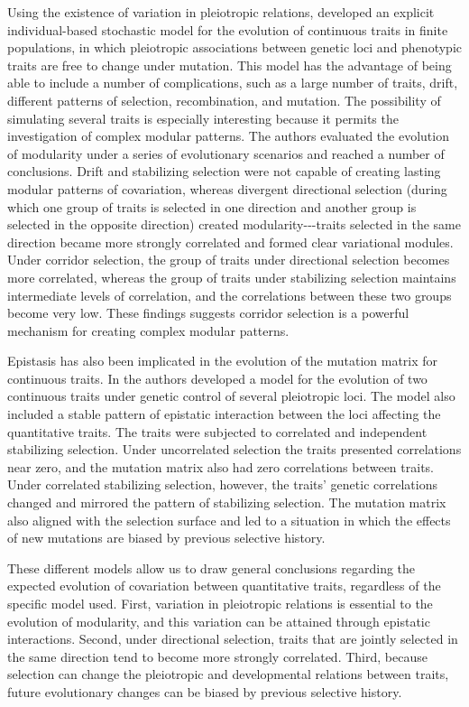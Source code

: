 \begin{refsection}
Using the existence of variation in pleiotropic relations,
\textcite{Melo2015-bk} developed an
explicit individual-based stochastic model for the evolution of
continuous traits in finite populations, in which pleiotropic
associations between genetic loci and phenotypic traits are free to
change under mutation. This model has the advantage of being able to
include a number of complications, such as a large number of traits,
drift, different patterns of selection, recombination, and mutation. The
possibility of simulating several traits is especially interesting
because it permits the investigation of complex modular patterns. The
authors evaluated the evolution of modularity under a series of
evolutionary scenarios and reached a number of conclusions. Drift and
stabilizing selection were not capable of creating lasting modular
patterns of covariation, whereas divergent directional selection (during
which one group of traits is selected in one direction and another group
is selected in the opposite direction) created modularity-\/-\/-traits
selected in the same direction became more strongly correlated and
formed clear variational modules. Under corridor selection, the group of
traits under directional selection becomes more correlated, whereas the
group of traits under stabilizing selection maintains intermediate
levels of correlation, and the correlations between these two groups
become very low. These findings suggests corridor selection is a
powerful mechanism for creating complex modular patterns.

Epistasis has also been implicated in the evolution of the mutation
matrix for continuous traits. In \textcite{Jones2014-wj} the authors developed a model for the evolution of two
continuous traits under genetic control of several pleiotropic loci. The
model also included a stable pattern of epistatic interaction between
the loci affecting the quantitative traits. The traits were subjected to
correlated and independent stabilizing selection. Under uncorrelated
selection the traits presented correlations near zero, and the mutation
matrix also had zero correlations between traits. Under correlated
stabilizing selection, however, the traits' genetic correlations changed
and mirrored the pattern of stabilizing selection. The mutation matrix
also aligned with the selection surface and led to a situation in which
the effects of new mutations are biased by previous selective history.

These different models allow us to draw general conclusions regarding
the expected evolution of covariation between quantitative traits,
regardless of the specific model used. First, variation in pleiotropic
relations is essential to the evolution of modularity, and this
variation can be attained through epistatic interactions. Second, under
directional selection, traits that are jointly selected in the same
direction tend to become more strongly correlated. Third, because
selection can change the pleiotropic and developmental relations between
traits, future evolutionary changes can be biased by previous selective
history.


\end{refsection}
